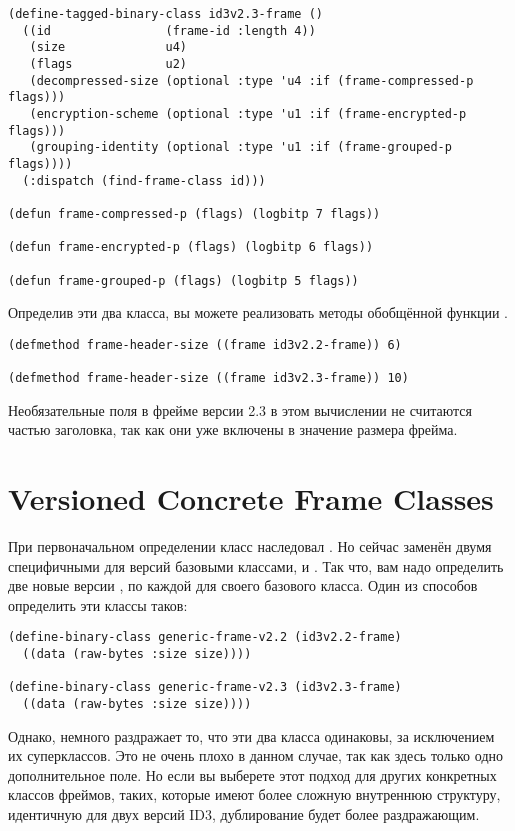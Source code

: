 \begin{lstlisting}
(define-tagged-binary-class id3v2.3-frame ()
  ((id                (frame-id :length 4))
   (size              u4)
   (flags             u2)
   (decompressed-size (optional :type 'u4 :if (frame-compressed-p flags)))
   (encryption-scheme (optional :type 'u1 :if (frame-encrypted-p flags)))
   (grouping-identity (optional :type 'u1 :if (frame-grouped-p flags))))
  (:dispatch (find-frame-class id)))

(defun frame-compressed-p (flags) (logbitp 7 flags))

(defun frame-encrypted-p (flags) (logbitp 6 flags))

(defun frame-grouped-p (flags) (logbitp 5 flags))
\end{lstlisting}

Определив эти два класса, вы можете реализовать методы обобщённой функции
.

\begin{lstlisting}
(defmethod frame-header-size ((frame id3v2.2-frame)) 6)

(defmethod frame-header-size ((frame id3v2.3-frame)) 10)
\end{lstlisting}

Необязательные поля в фрейме версии 2.3 в этом вычислении не считаются частью заголовка,
так как они уже включены в значение размера фрейма.

\section{Versioned Concrete Frame Classes}

При первоначальном определении класс  наследовал . Но
сейчас  заменён двумя специфичными для версий базовыми классами,
 и . Так что, вам надо определить две новые версии
, по каждой для своего базового класса. Один из способов определить
эти классы таков:

\begin{lstlisting}
(define-binary-class generic-frame-v2.2 (id3v2.2-frame)
  ((data (raw-bytes :size size))))

(define-binary-class generic-frame-v2.3 (id3v2.3-frame)
  ((data (raw-bytes :size size))))
\end{lstlisting}

Однако, немного раздражает то, что эти два класса одинаковы, за исключением их
суперклассов. Это не очень плохо в данном случае, так как здесь только одно дополнительное
поле. Но если вы выберете этот подход для других конкретных классов фреймов, таких,
которые имеют более сложную внутреннюю структуру, идентичную для двух версий ID3,
дублирование будет более раздражающим.

